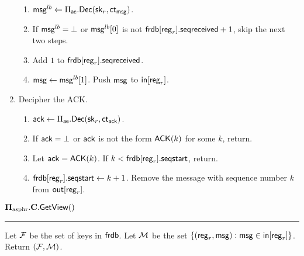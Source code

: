 \begin{definition}
\begin{enumerate}
    \begin{enumerate}
        \item $\mathsf{msg}^{lb} \leftarrow \Pi_{\mathsf{ae}}.\mathsf{Dec}({\mathsf{sk}}_{r}, \mathsf{ct}_{\mathsf{msg}})$.
        \item If $\mathsf{msg}^{lb} = \bot$ or $\mathsf{msg}^{lb}[0]$ is not $\mathsf{frdb}[\mathsf{reg}_r].\mathsf{seqreceived} + 1$, skip the next two steps.
        \item Add $1$ to $\mathsf{frdb}[\mathsf{reg}_r].\mathsf{seqreceived}$. 
        \item $\mathsf{msg} \leftarrow \mathsf{msg}^{lb}[1]$. Push $\mathsf{msg}$ to $\mathsf{in}[\mathsf{reg}_r]$.
    \end{enumerate}
    \item Decipher the ACK.
    \begin{enumerate}
        \item $\mathsf{ack} \leftarrow \Pi_{\mathsf{ae}}.\mathsf{Dec}({\mathsf{sk}}_{r}, \mathsf{ct}_{\mathsf{ack}})$.
        \item If $\mathsf{ack} = \bot$ or $\mathsf{ack}$ is not the form $\mathsf{ACK}(k)$ for some $k$, return.
        \item Let $\mathsf{ack} = \mathsf{ACK}(k)$. If $k < \mathsf{frdb}[\mathsf{reg}_r].\mathsf{seqstart}$, return.
        \item $\mathsf{frdb}[\mathsf{reg}_r].\mathsf{seqstart} \leftarrow k + 1$. Remove the message with sequence number $k$ from $\mathsf{out}[\mathsf{reg}_r]$.
    \end{enumerate}
\end{enumerate}
\vspace{10pt}
$\mathbf{\Pi_{\text{asphr}}.C.\mathsf{GetView}}()$
\vspace{5pt}
\hrule
\vspace{5pt}
Let $\mathcal{F}$ be the set of keys in $\mathsf{frdb}$. Let $\mathcal{M}$ be the set $\{(\mathsf{reg}_r, \mathsf{msg}): \mathsf{msg} \in \mathsf{in}[\mathsf{reg}_r]\}$. Return $(\mathcal{F}, \mathcal{M})$.

\end{definition}
